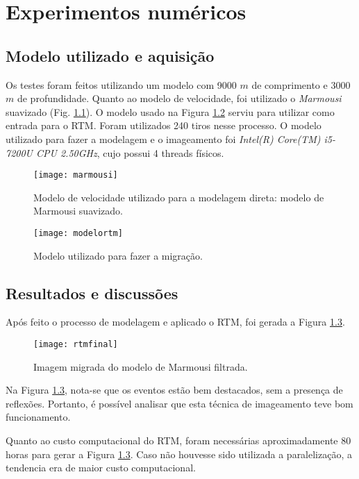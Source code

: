 \chapter{Experimentos numéricos}
\label{cap4}

\section{Modelo utilizado e aquisição}

 Os testes foram feitos utilizando um modelo com 9000 $m$ de comprimento e 3000 $m$ de profundidade. Quanto ao modelo de velocidade, foi utilizado o \textit{Marmousi} suavizado (Fig. \ref{fig:marmousi}). O modelo usado na Figura \ref{fig:modelortm} serviu para utilizar como entrada para o RTM. Foram utilizados 240 tiros nesse processo. O modelo utilizado para fazer a modelagem e o imageamento foi \textit{Intel(R) Core(TM) i5-7200U CPU 2.50GHz}, cujo possui 4 threads físicos.
 
 \begin{figure}[ht!]
	\centering
	\texttt{[image: marmousi]}
	\caption{Modelo de velocidade utilizado para a modelagem direta: modelo de Marmousi suavizado.} \label{fig:marmousi}
\end{figure} 
\begin{figure}[ht!]
	\centering
	\texttt{[image: modelortm]}
	\caption{Modelo utilizado para fazer a migração.} \label{fig:modelortm}
\end{figure} 
 \section{Resultados e discussões}
 
 Após feito o processo de modelagem e aplicado o RTM, foi gerada a Figura \ref{fig:rtm}. 
 \begin{figure}[ht!]
 	\centering
 	\texttt{[image: rtmfinal]}
 	\caption{Imagem migrada do modelo de Marmousi filtrada.} \label{fig:rtm}
 \end{figure} 
 Na Figura \ref{fig:rtm}, nota-se que os eventos estão bem destacados, sem a presença de reflexões. Portanto, é possível analisar que esta técnica de imageamento teve bom funcionamento.
 
  Quanto ao custo computacional do RTM, foram necessárias aproximadamente 80 horas para gerar a Figura \ref{fig:rtm}. Caso não houvesse sido utilizada a paralelização, a tendencia era de maior custo computacional.








